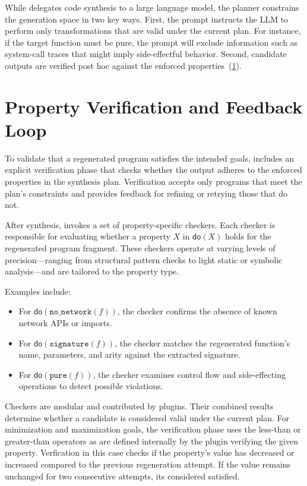\documentclass[a4paper,twoside,12pt]{report} %
\begin{document}
While \sys delegates code synthesis to a large language model, the planner constrains the generation space in two key ways.
First, the prompt instructs the LLM to perform only transformations that are valid under the current plan.
For instance, if the target function must be pure, the prompt will exclude information such as system-call traces that might imply side-effectful behavior.
Second, candidate outputs are verified post hoc against the enforced properties~(\cref{sec:verification}).

\chapter{Property Verification and Feedback Loop}
\label{sec:verification}

To validate that a regenerated program satisfies the intended goals, \sys includes an explicit verification phase that checks whether the output adheres to the enforced properties in the synthesis plan. 
Verification accepts only programs that meet the plan's constraints and provides feedback for refining or retrying those that do not.

After synthesis, \sys invokes a set of property-specific checkers. Each checker is responsible for evaluating whether a property $X$ in $\mathsf{do}(X)$ holds for the regenerated program fragment. These checkers operate at varying levels of precision---ranging from structural pattern checks to light static or symbolic analysis---and are tailored to the property type.

Examples include:
\begin{itemize}
  \item For $\mathsf{do}(\texttt{no\_network}(f))$, the checker confirms the absence of known network APIs or imports.
  \item For $\mathsf{do}(\texttt{signature}(f))$, the checker matches the regenerated function's name, parameters, and arity against the extracted signature.
  \item For $\mathsf{do}(\texttt{pure}(f))$, the checker examines control flow and side-effecting operations to detect possible violations.
\end{itemize}

Checkers are modular and contributed by plugins. Their combined results determine whether a candidate is considered valid under the current plan.
For minimization and maximization goals, the verification phase uses the less-than or greater-than operators as are defined internally by the plugin verifying the given property.
Verfication in this case checks if the property's value has decreased or increased compared 
to the previous regeneration attempt.
If the value remains unchanged for two consecutive attempts, its considered satisfied.
\end{document}
